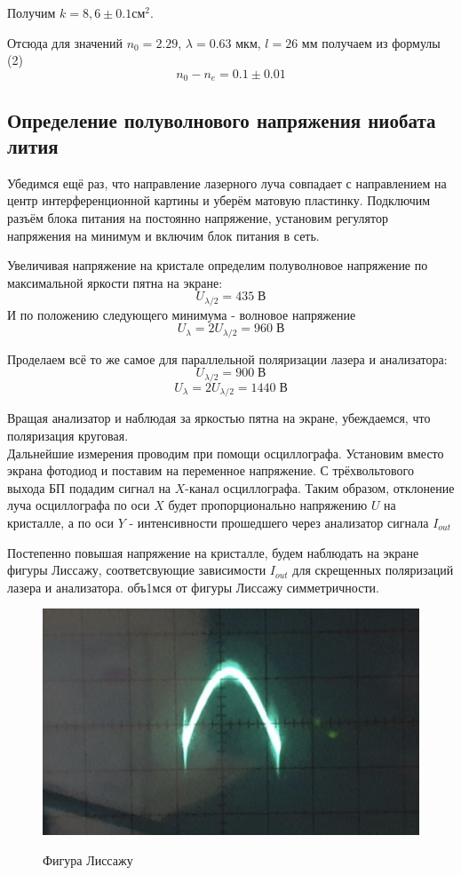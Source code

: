 \documentclass[11pt]{article}
\begin{document}
Получим $k =  8,6 \pm 0.1 \text{см}^2$. 

Отсюда для значений $n_0 = 2.29$, $\lambda = 0.63 \text{ мкм}$, $l = 26 \text{ мм}$ получаем из формулы (2)
\[
\boxed{n_0 - n_e = 0.1 \pm 0.01}
\]



\subsection*{Определение полуволнового напряжения ниобата лития}
 Убедимся ещё раз, что направление лазерного луча совпадает с направлением на центр интерференционной картины и уберём матовую пластинку. Подключим разъём блока питания на постоянно напряжение, установим регулятор напряжения на минимум и включим блок питания в сеть.

Увеличивая напряжение на кристале определим полуволновое напряжение по максимальной яркости пятна на
экране:
\begin{equation} \label{eq:U0.5}
  U_{\lambda/2} = 435\;В
\end{equation}
И по положению следующего минимума - волновое напряжение
\[ U_{\lambda} = 2 U_{\lambda/2} = 960\; В\]

Проделаем всё то же самое для параллельной поляризации лазера и анализатора:
\[ U_{\lambda/2} = 900\;В\]
\[ U_{\lambda} = 2 U_{\lambda/2} = 1440\;В\]

Вращая анализатор и наблюдая за яркостью пятна на экране, убеждаемся, что поляризация круговая.\\

Дальнейшие измерения проводим при помощи осциллографа. Установим вместо экрана фотодиод и поставим на переменное напряжение. С трёхвольтового
выхода БП подадим сигнал на  \(X\)-канал осциллографа. Таким образом, отклонение луча осциллографа по
оси \(X\) будет пропорционально напряжению \(U\) на кристалле, а по оси \(Y\) - интенсивности прошедшего
через анализатор сигнала \(I_{out}\)

Постепенно повышая напряжение на кристалле, будем наблюдать на экране фигуры Лиссажу, соответсвующие
зависимости \(I_{out}\) для скрещенных поляризаций лазера и анализатора. объ1мся от фигуры Лиссажу
симметричности.

\begin{figure}[H]
  \centering
  \includegraphics[width=\textwidth]{L1.png}\label{fig:L}
  \caption{Фигура Лиссажу}
\end{figure}
\end{document}
